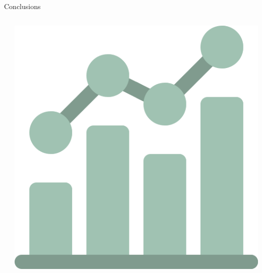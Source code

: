 \documentclass[9pt, pstricks, xcolor=dvipsnames]{beamer}
\begin{document}
\begin{frame}{Conclusions}
\begin{columns}
\begin{column}{0.33\textwidth}
    \pause
  \end{column}
  \begin{column}{0.33\textwidth}
    \centering
    \includegraphics[scale=0.2]{images/metrics.png}
  \end{column}
\end{columns}

\end{frame}
\end{document}
